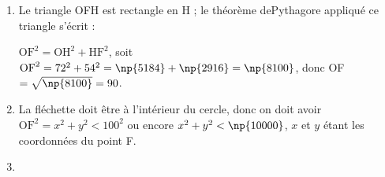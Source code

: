 \begin{enumerate}
\item %
Le triangle OFH est rectangle en H ; le théorème dePythagore appliqué ce triangle s'écrit :

$\text{OF}^2 = \text{OH}^2 + \text{HF}^2$, soit $\text{OF}^2 =  72^2 + 54^2 = \np{5184} + \np{2916} = \np{8100}$, donc OF $= \sqrt{\np{8100}} = 90$.

\item %
La fléchette doit être à l'intérieur du cercle, donc on doit avoir $\text{OF}^2 = x^2 + y^2 < 100^2$ ou encore $x^2 + y^2 < \np{10000}$, $x$ et $y$ étant les coordonnées du point F.
\item %







\end{enumerate}
